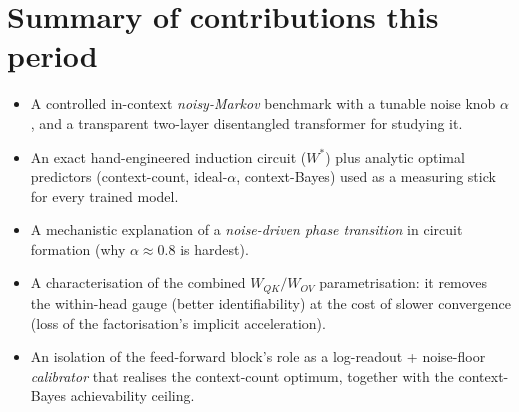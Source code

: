 \documentclass[12pt]{article}
\begin{document}
\section{Summary of contributions this period}
\begin{itemize}
\item A controlled in-context \emph{noisy-Markov} benchmark with a tunable noise knob $\alpha$, and
a transparent two-layer disentangled transformer for studying it.
\item An exact hand-engineered induction circuit ($W^{*}$) plus analytic optimal predictors
(context-count, ideal-$\alpha$, context-Bayes) used as a measuring stick for every trained model.
\item A mechanistic explanation of a \emph{noise-driven phase transition} in circuit formation
(why $\alpha\approx 0.8$ is hardest).
\item A characterisation of the combined $W_{QK}/W_{OV}$ parametrisation: it removes the within-head
gauge (better identifiability) at the cost of slower convergence (loss of the factorisation's
implicit acceleration).
\item An isolation of the feed-forward block's role as a log-readout + noise-floor \emph{calibrator}
that realises the context-count optimum, together with the context-Bayes achievability ceiling.
\end{itemize}
\end{document}
